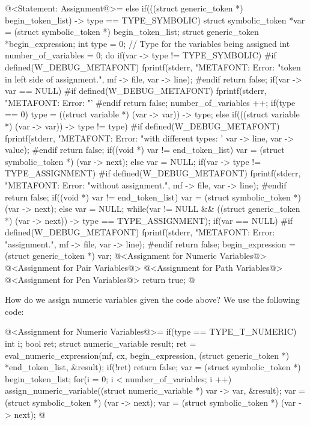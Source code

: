 \iniciocodigo
@<Statement: Assignment@>=
else if(((struct generic_token *) begin_token_list) -> type ==
        TYPE_SYMBOLIC){
  struct symbolic_token *var = (struct symbolic_token *) begin_token_list;
  struct generic_token *begin_expression;
  int type = 0; // Type for the variables being assigned
  int number_of_variables = 0;
  do{
    if(var -> type != TYPE_SYMBOLIC){
#if defined(W_DEBUG_METAFONT)
      fprintf(stderr, "METAFONT: Error: %
              "token in left side of assignment.\n", mf -> file,
              var -> line);
#endif
      return false;
    }
    if(var -> var == NULL){
#if defined(W_DEBUG_METAFONT)
      fprintf(stderr, "METAFONT: Error: %
              "'%
#endif
      return false;
    }
    number_of_variables ++;
    if(type == 0)
      type = ((struct variable *) (var -> var)) -> type;
    else if(((struct variable *) (var -> var)) -> type != type){
#if defined(W_DEBUG_METAFONT)
      fprintf(stderr, "METAFONT: Error: %
              "with different types: '%
              var -> line, var -> value);
#endif
      return false;
    }
    if((void *) var != end_token_list)
      var = (struct symbolic_token *) (var -> next);
    else
      var = NULL;
    if(var -> type != TYPE_ASSIGNMENT){
#if defined(W_DEBUG_METAFONT)
      fprintf(stderr, "METAFONT: Error: %
              "without assignment.\n", mf -> file, var -> line);
#endif
      return false;
    }
    if((void *) var != end_token_list)
      var = (struct symbolic_token *) (var -> next);
    else
      var = NULL;
  } while(var != NULL &&
          ((struct generic_token *) (var -> next)) -> type ==
          TYPE_ASSIGNMENT);
  if(var == NULL){
#if defined(W_DEBUG_METAFONT)
      fprintf(stderr, "METAFONT: Error: %
              "assignment.\n", mf -> file, var -> line);
#endif
      return false;
  }
  begin_expression = (struct generic_token *) var;
  @<Assignment for Numeric Variables@>
  @<Assignment for Pair Variables@>
  @<Assignment for Path Variables@>
  @<Assignment for Pen Variables@>
  return true;
}
@
\fimcodigo


How do we assign numeric variables given the code above? We use the
following code:

\iniciocodigo
@<Assignment for Numeric Variables@>=
if(type == TYPE_T_NUMERIC){
  int i;
  bool ret;
  struct numeric_variable result;
  ret = eval_numeric_expression(mf, cx, begin_expression,
                               (struct generic_token *) *end_token_list,
                               &result);
  if(!ret)
    return false;
  var = (struct symbolic_token *) begin_token_list;
  for(i = 0; i < number_of_variables; i ++){
    assign_numeric_variable((struct numeric_variable *) var -> var,
                            &result);
    var = (struct symbolic_token *) (var -> next);
    var = (struct symbolic_token *) (var -> next);
  }
}
@
\fimcodigo

